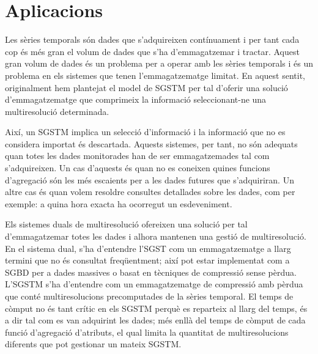 




\section{Aplicacions}



Les sèries temporals són dades que s'adquireixen contínuament i per
tant cada cop és més gran el volum de dades que s'ha d'emmagatzemar i
tractar. Aquest gran volum de dades és un problema per a operar amb
les sèries temporals i és un problema en els sistemes que tenen
l'emmagatzematge limitat. En aquest sentit, originalment hem
plantejat el model de \gls{SGSTM} per tal d'oferir una solució
d'emmagatzematge que comprimeix la informació seleccionant-ne una
multiresolució determinada.


Així, un \gls{SGSTM} implica un selecció d'informació i la informació
que no es considera importat és descartada. Aquests sistemes, per
tant, no són adequats quan totes les dades monitorades han de ser
emmagatzemades tal com s'adquireixen. Un cas d'aquests és quan no es
coneixen quines funcions d'agregació són les més escaients per a les
dades futures que s'adquiriran. Un altre cas és quan volem resoldre
consultes detallades sobre les dades, com per exemple: a quina hora
exacta ha ocorregut un esdeveniment.


Els sistemes duals de multiresolució ofereixen una solució per tal
d'emmagatzemar totes les dades i alhora mantenen una gestió de
multiresolució.  En el sistema dual, s'ha d'entendre l'\gls{SGST} com
un emmagatzematge a llarg termini que no és consultat freqüentment;
així pot estar implementat com a \gls{SGBD} per a dades massives o
basat en tècniques de compressió sense pèrdua. L'\gls{SGSTM} s'ha
d'entendre com un emmagatzematge de compressió amb pèrdua que conté
multiresolucions precomputades de la sèries temporal.  El temps de
còmput no és tant crític en els \gls{SGSTM} perquè es reparteix al
llarg del temps, és a dir tal com es van adquirint les dades; més
enllà del temps de còmput de cada funció d'agregació d'atributs, el
qual limita la quantitat de multiresolucions diferents que pot
gestionar un mateix \gls{SGSTM}.


